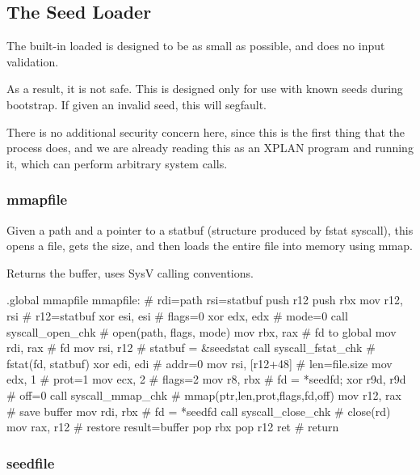 \subsection{The Seed Loader}

The built-in loaded is designed to be as small as possible, and does
no input validation.

As a result, it is not safe.  This is designed only for use with known
seeds during bootstrap.  If given an invalid seed, this will segfault.

There is no additional security concern here, since this is the first
thing that the process does, and we are already reading this as an XPLAN
program and running it, which can perform arbitrary system calls.

\subsubsection{mmapfile}

Given a path and a pointer to a statbuf (structure produced by fstat
syscall), this opens a file, gets the size, and then loads the entire
file into memory using mmap.

Returns the buffer, uses SysV calling conventions.

\begin{asm}
.global mmapfile
mmapfile:                                   # rdi=path rsi=statbuf
	push	r12
	push	rbx
	mov	r12, rsi                    # r12=statbuf
	xor	esi, esi                    # flags=0
	xor	edx, edx                    # mode=0
	call	syscall_open_chk            # open(path, flags, mode)
	mov	rbx, rax                    # fd to global
	mov	rdi, rax                    # fd
	mov	rsi, r12                    # statbuf = &seedstat
	call	syscall_fstat_chk           # fstat(fd, statbuf)
	xor	edi, edi                    # addr=0
	mov	rsi, [r12+48]               # len=file.size
	mov	edx, 1                      # prot=1
	mov	ecx, 2                      # flags=2
	mov	r8, rbx                     # fd = *seedfd;
	xor	r9d, r9d                    # off=0
	call	syscall_mmap_chk            # mmap(ptr,len,prot,flags,fd,off)
	mov	r12, rax                    # save buffer
	mov	rdi, rbx                    # fd = *seedfd
	call	syscall_close_chk           # close(rd)
	mov	rax, r12                    # restore result=buffer
	pop	rbx
	pop	r12
	ret                                 # return
\end{asm}

\subsubsection{seedfile}

